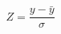 \documentclass[]{book}\usepackage[]{graphicx}\usepackage[]{color}
\begin{document}
\begin{equation}
Z = \frac{y - \bar{y}}{\sigma}
\end{equation}


% 
% 
\end{document}
